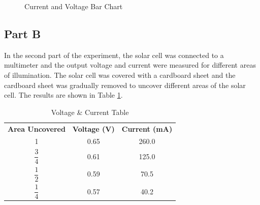 \documentclass[a4paper, 12pt, english]{article}
\begin{document}
\begin{figure}[H]
	\centering
	\caption{Current and Voltage Bar Chart}
\end{figure}

\subsection{Part B}
In the second part of the experiment, the solar cell was connected to a
multimeter and the output voltage and current were measured for different areas
of illumination. The solar cell was covered with a cardboard sheet and the
cardboard sheet was gradually removed to uncover different areas of the solar
cell. The results are shown in Table \ref{tab:Table 2}.

\begin{table}[H]
	\caption{\label{tab:Table 2} Voltage \& Current Table}
	\centering
	\begin{tabular}{c c c}
		\toprule
		\textbf{Area Uncovered}
		               & \textbf{Voltage (V)}
		               & \textbf{Current (mA)}         \\
		\cmidrule[0.4pt](r{0.125em}){1-1}%
		\cmidrule[0.4pt](lr{0.125em}){2-2}%
		\cmidrule[0.4pt](lr{0.125em}){3-3}%
		1              & 0.65                  & 260.0 \\
		$\dfrac{3}{4}$ & 0.61                  & 125.0 \\
		$\dfrac{1}{2}$ & 0.59                  & 70.5  \\
		$\dfrac{1}{4}$ & 0.57                  & 40.2  \\
		\bottomrule
	\end{tabular}
\end{table}
\end{document}
